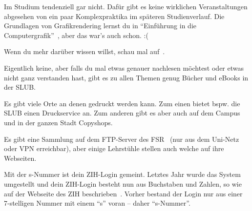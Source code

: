 Im Studium tendenziell gar nicht. Dafür gibt es keine wirklichen Veranstaltungen abgesehen von ein paar Komplexpraktika im späteren Studienverlauf. Die Grundlagen von Grafikrendering lernst du in \enquote{Einführung in die Computergrafik}~, aber das war's auch schon. :(

\label{minisec:faq}
Wenn du mehr darüber wissen willst, schau mal auf~.

Eigentlich keine, aber falls du mal etwas genauer nachlesen möchtest oder etwas nicht ganz verstanden hast, gibt es zu allen Themen genug Bücher und eBooks in der SLUB.~

Es gibt viele Orte an denen gedruckt werden kann. Zum einen bietet bspw. die SLUB einen Druckservice an. Zum anderen gibt es aber auch auf dem Campus und in der ganzen Stadt Copyshops.

Es gibt eine Sammlung auf dem FTP-Server des FSR~ (nur aus dem Uni-Netz oder VPN erreichbar), aber einige Lehrstühle stellen auch welche auf ihre Webseiten.

Mit der s-Nummer ist dein ZIH-Login gemeint. Letztes Jahr wurde das System umgestellt und dein ZIH-Login besteht nun aus Buchstaben und Zahlen, so wie auf der Webseite des ZIH beschrieben~. Vorher bestand der Login nur aus einer 7-stelligen Nummer mit einem \enquote{s} voran -- daher \enquote{s-Nummer}.
